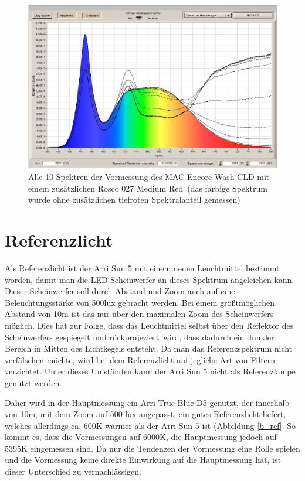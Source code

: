 \begin{figure}[H]     %
\centering
\includegraphics[width=1.0\textwidth]{bilder/encorevor1} 
\caption {Alle 10 Spektren der Vormessung des MAC Encore Wash CLD mit einem zusätzlichen  Rosco 027 \glqq Medium Red\grqq\ (das farbige Spektrum wurde ohne zusätzlichen tiefroten Spektralanteil gemessen)}\label{b_encorevor1}
\end{figure}


\section{Referenzlicht}
\label{sec_reflicht}
Als Referenzlicht ist der Arri Sun 5 mit einem neuen Leuchtmittel bestimmt worden, damit man die LED-Scheinwerfer an dieses Spektrum angeleichen kann. Dieser Scheinwerfer soll durch Abstand und Zoom auch auf eine Beleuchtungsstärke von 500lux gebracht werden. Bei einem größtmöglichen Abstand von 10m ist das nur über den maximalen Zoom des Scheinwerfers möglich. Dies hat zur Folge, dass das Leuchtmittel selbst über den Reflektor des Scheinwerfers gespiegelt und \glqq rückprojeziert\grqq\ wird, dass dadurch ein dunkler Bereich in Mitten des Lichtkegels entsteht. Da man das Referenzspektrum nicht verfälschen möchte, wird bei dem Referenzlicht auf jegliche Art von Filtern verzichtet. Unter dieses Umständen kann der Arri Sun 5 nicht als Referenzlampe genutzt werden.

Daher wird in der Hauptmessung ein Arri True Blue D5 genutzt, der innerhalb von 10m, mit dem Zoom auf 500 lux angepasst, ein gutes Referenzlicht liefert, welches allerdings ca. 600K wärmer als der Arri Sun 5 ist (Abbildung \ref{b_ref}. So kommt es, dass die Vormessungen auf 6000K, die Hauptmessung jedoch auf 5395K eingemessen sind. Da nur die Tendenzen der Vormessung eine Rolle spielen und die Vormessung keine direkte Einwirkung auf die Hauptmessung hat, ist dieser Unterschied zu vernachlässigen.

